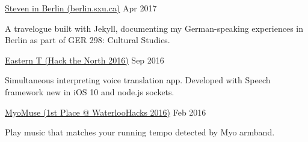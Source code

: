 \begin{cventries}
        \cventry
        {}
        {\href{https://berlin.sxu.ca}{Steven in Berlin (berlin.sxu.ca)}}
        {Apr 2017}
        {}
        {
            \begin{cvitems}
                \item {A travelogue built with Jekyll, documenting my German-speaking experiences in Berlin as part of GER 298: Cultural Studies.}
            \end{cvitems}
        }
    \cventry
        {}
        {\href{https://git.io/viAIx}{Eastern T (Hack the North 2016)}}
        {Sep 2016}
        {}
        {
            \begin{cvitems}
                \item {Simultaneous interpreting voice translation app. Developed with Speech framework new in iOS 10 and node.js sockets.}
            \end{cvitems}
        }
    \cventry
        {}
        {\href{https://git.io/v20XC}{MyoMuse (1st Place @ WaterlooHacks 2016)}}
        {Feb 2016}
        {}
        {
            \begin{cvitems}
                \item {Play music that matches your running tempo detected by Myo armband.}
            \end{cvitems}
        }
\end{cventries}
